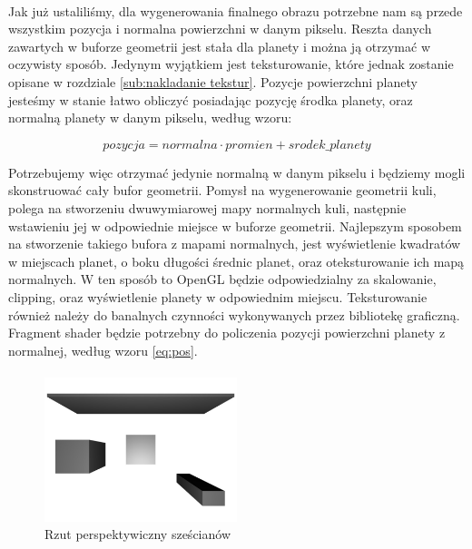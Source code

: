 \paragraph{}

Jak już ustaliliśmy, dla wygenerowania finalnego obrazu potrzebne nam są przede wszystkim pozycja i normalna powierzchni w danym pikselu. Reszta danych zawartych w buforze geometrii jest stała dla planety i można ją otrzymać w oczywisty sposób. Jedynym wyjątkiem jest teksturowanie, które jednak zostanie opisane w rozdziale \hyperref[sub:nakladanie tekstur]{\ref{sub:nakladanie tekstur}}. Pozycje powierzchni planety jesteśmy w stanie łatwo obliczyć posiadając pozycję środka planety, oraz normalną planety w danym pikselu, według wzoru:

\begin{equation} \label{eq:pos}
pozycja = normalna \cdot promien + srodek\_planety
\end{equation}

Potrzebujemy więc otrzymać jedynie normalną w danym pikselu i będziemy mogli skonstruować cały bufor geometrii. Pomysł na wygenerowanie geometrii kuli, polega na stworzeniu dwuwymiarowej mapy normalnych kuli, następnie wstawieniu jej w odpowiednie miejsce w buforze geometrii. Najlepszym sposobem na stworzenie takiego bufora z mapami normalnych, jest wyświetlenie kwadratów w miejscach planet, o boku długości średnic planet, oraz oteksturowanie ich mapą normalnych. W ten sposób to OpenGL będzie odpowiedzialny za skalowanie, clipping, oraz wyświetlenie planety w odpowiednim miejscu. Teksturowanie również należy do banalnych czynności wykonywanych przez bibliotekę graficzną. Fragment shader będzie potrzebny do policzenia pozycji powierzchni planety z normalnej, według wzoru \hyperref[eq:pos]{\ref{eq:pos}}.

\paragraph{}

\begin{figure}
\centering
	\includegraphics[width=0.5\textwidth]{img/proj_rend.jpg}
\caption{Rzut perspektywiczny sześcianów}
\label{fig:proj}
\end{figure}

